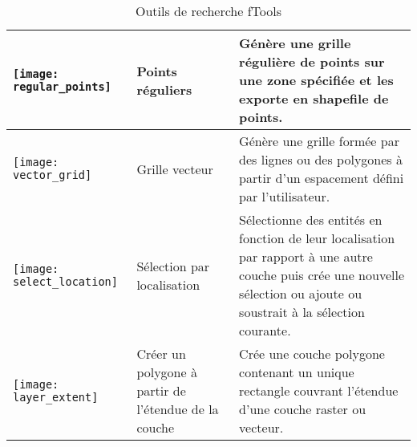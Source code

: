 \begin{table}[ht]
\begin{tabular}{|m{1cm}|m{3cm}|m{12cm}|}
 \hline \texttt{[image: regular\_points]} & Points réguliers & Génère une grille régulière de points sur une zone spécifiée et les exporte en shapefile de points. \\
 \hline \texttt{[image: vector\_grid]} & Grille vecteur & Génère une grille formée par des lignes ou des polygones à partir d'un espacement défini par l'utilisateur. \\
 \hline \texttt{[image: select\_location]} & Sélection par localisation & Sélectionne des entités en fonction de leur localisation par rapport à une autre couche puis crée une nouvelle sélection ou ajoute ou soustrait à la sélection courante. \\
\hline \texttt{[image: layer\_extent]} & Créer un polygone à partir de l'étendue de la couche & Crée une couche polygone contenant un unique rectangle couvrant l'étendue d'une couche raster ou vecteur. \\
 \hline
\end{tabular}
\caption{Outils de recherche fTools}\label{tab:ftool_research}
\end{table}

